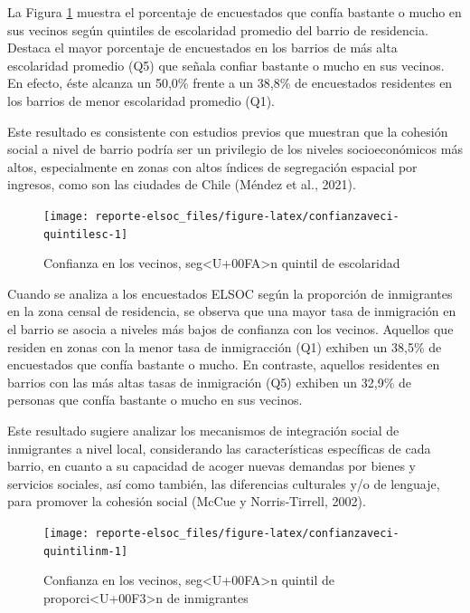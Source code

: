 \documentclass[
  12pt,
]{book}
\begin{document}
La Figura \ref{fig:confianzaveci-quintilesc} muestra el porcentaje de encuestados que confía bastante o mucho en sus vecinos según quintiles de escolaridad promedio del barrio de residencia. Destaca el mayor porcentaje de encuestados en los barrios de más alta escolaridad promedio (Q5) que señala confiar bastante o mucho en sus vecinos. En efecto, éste alcanza un 50,0\% frente a un 38,8\% de encuestados residentes en los barrios de menor escolaridad promedio (Q1).

Este resultado es consistente con estudios previos que muestran que la cohesión social a nivel de barrio podría ser un privilegio de los niveles socioeconómicos más altos, especialmente en zonas con altos índices de segregación espacial por ingresos, como son las ciudades de Chile (Méndez et al., 2021).

\begin{figure}

{\centering \texttt{[image: reporte-elsoc\_files/figure-latex/confianzaveci-quintilesc-1]} 

}

\caption{Confianza en los vecinos, seg<U+00FA>n quintil de  escolaridad}\label{fig:confianzaveci-quintilesc}
\end{figure}

Cuando se analiza a los encuestados ELSOC según la proporción de inmigrantes en la zona censal de residencia, se observa que una mayor tasa de inmigración en el barrio se asocia a niveles más bajos de confianza con los vecinos. Aquellos que residen en zonas con la menor tasa de inmigracción (Q1) exhiben un 38,5\% de encuestados que confía bastante o mucho. En contraste, aquellos residentes en barrios con las más altas tasas de inmigración (Q5) exhiben un 32,9\% de personas que confía bastante o mucho en sus vecinos.

Este resultado sugiere analizar los mecanismos de integración social de inmigrantes a nivel local, considerando las características específicas de cada barrio, en cuanto a su capacidad de acoger nuevas demandas por bienes y servicios sociales, así como también, las diferencias culturales y/o de lenguaje, para promover la cohesión social (McCue y Norris‐Tirrell, 2002).

\begin{figure}

{\centering \texttt{[image: reporte-elsoc\_files/figure-latex/confianzaveci-quintilinm-1]} 

}

\caption{Confianza en los vecinos, seg<U+00FA>n quintil de proporci<U+00F3>n de inmigrantes}\label{fig:confianzaveci-quintilinm}
\end{figure}
\end{document}
